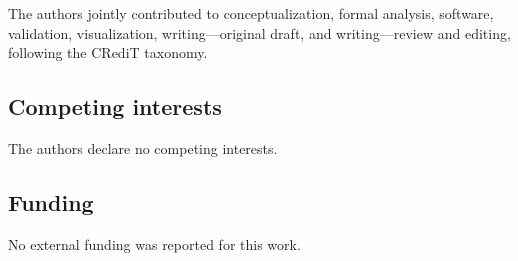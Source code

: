 The authors jointly contributed to conceptualization, formal analysis,
software, validation, visualization, writing---original draft, and
writing---review and editing, following the CRediT taxonomy.

\subsection*{Competing interests}

The authors declare no competing interests.

\subsection*{Funding}

No external funding was reported for this work.

